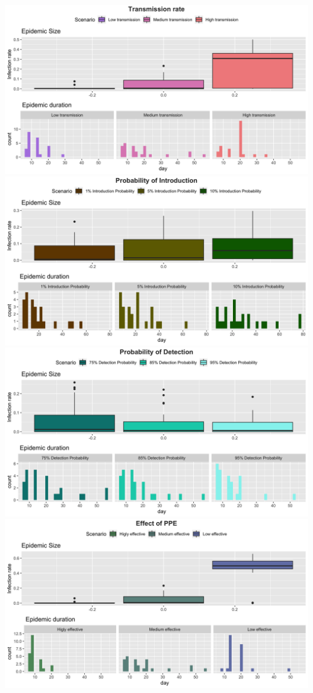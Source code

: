 \documentclass[
]{article}
\begin{document}
\includegraphics{Figures/SensitivityAnalysis/Transmission}\\
\includegraphics{Figures/SensitivityAnalysis/Introduction}\\
\includegraphics{Figures/SensitivityAnalysis/ProbDetection}\\
\includegraphics{Figures/SensitivityAnalysis/PPE}
\end{document}
